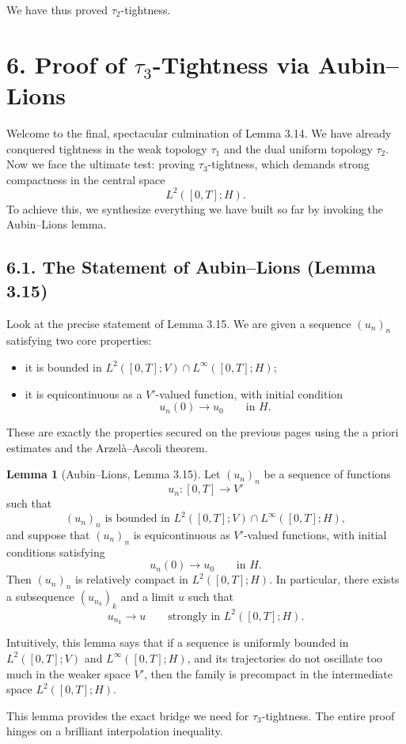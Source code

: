 \documentclass[11pt]{article}
\theoremstyle{definition}
\newtheorem{lemma}{Lemma}
\theoremstyle{remark}
\begin{document}
We have thus proved $\tau_2$-tightness.

\section*{6. Proof of $\tau_3$-Tightness via Aubin--Lions}
Welcome to the final, spectacular culmination of Lemma 3.14. We have already conquered tightness in the weak topology $\tau_1$ and the dual uniform topology $\tau_2$. Now we face the ultimate test: proving $\tau_3$-tightness, which demands strong compactness in the central space
\[
  L^2([0,T];H).
\]
To achieve this, we synthesize everything we have built so far by invoking the Aubin--Lions lemma.

\subsection*{6.1. The Statement of Aubin--Lions (Lemma 3.15)}
Look at the precise statement of Lemma 3.15. We are given a sequence $(u_n)_n$ satisfying two core properties:
\begin{itemize}
\item it is bounded in $L^2([0,T];V)\cap L^\infty([0,T];H)$;
\item it is equicontinuous as a $V'$-valued function, with initial condition
\[
  u_n(0)\to u_0 \qquad \text{in } H.
\]
\end{itemize}
These are exactly the properties secured on the previous pages using the a priori estimates and the Arzel\`a--Ascoli theorem.

\begin{lemma}[Aubin--Lions, Lemma 3.15]
Let $(u_n)_n$ be a sequence of functions
\[
  u_n:[0,T]\to V'
\]
such that
\[
  (u_n)_n \text{ is bounded in } L^2([0,T];V)\cap L^\infty([0,T];H),
\]
and suppose that $(u_n)_n$ is equicontinuous as $V'$-valued functions, with initial conditions satisfying
\[
  u_n(0)\to u_0 \qquad \text{in } H.
\]
Then $(u_n)_n$ is relatively compact in $L^2([0,T];H)$. In particular, there exists a subsequence $(u_{n_k})_k$ and a limit $u$ such that
\[
  u_{n_k}\to u
  \qquad \text{strongly in } L^2([0,T];H).
\]
\end{lemma}

Intuitively, this lemma says that if a sequence is uniformly bounded in $L^2([0,T];V)$ and $L^\infty([0,T];H)$, and its trajectories do not oscillate too much in the weaker space $V'$, then the family is precompact in the intermediate space $L^2([0,T];H)$.

This lemma provides the exact bridge we need for $\tau_3$-tightness. The entire proof hinges on a brilliant interpolation inequality.
\end{document}
